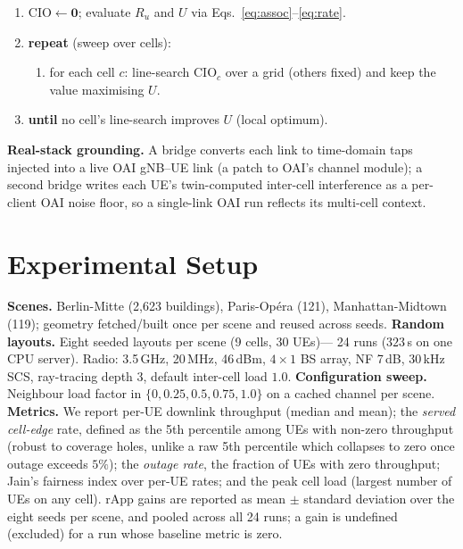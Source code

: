 \documentclass[conference]{IEEEtran}
\begin{document}
\begin{algorithm}[t]
\caption{Proportional-fair traffic steering}
\label{alg:ts}
\footnotesize
\begin{enumerate}
\item $\mathrm{CIO}\leftarrow \mathbf{0}$; evaluate $R_u$ and $U$ via
Eqs.~\eqref{eq:assoc}--\eqref{eq:rate}.
\item \textbf{repeat} (sweep over cells):
  \begin{enumerate}
  \item for each cell $c$: line-search $\mathrm{CIO}_c$ over a grid (others fixed)
  and keep the value maximising $U$.
  \end{enumerate}
\item \textbf{until} no cell's line-search improves $U$ (local optimum).
\end{enumerate}
\end{algorithm}

\textbf{Real-stack grounding.} A bridge converts each link to time-domain taps
injected into a live OAI gNB--UE link (a patch to OAI's channel module); a second
bridge writes each UE's twin-computed inter-cell interference as a per-client OAI
noise floor, so a single-link OAI run reflects its multi-cell context.

\section{Experimental Setup}
\textbf{Scenes.} Berlin-Mitte (2{,}623 buildings), Paris-Op\'era (121),
Manhattan-Midtown (119); geometry fetched/built once per scene and reused across
seeds. \textbf{Random layouts.} Eight seeded layouts per scene (9 cells, 30 UEs)---
24 runs ($323$\,s on one CPU server). Radio: 3.5\,GHz, 20\,MHz,
46\,dBm, $4\times1$ BS array, NF 7\,dB, 30\,kHz SCS, ray-tracing
depth 3, default inter-cell load $1.0$. \textbf{Configuration sweep.} Neighbour
load factor in $\{0,0.25,0.5,0.75,1.0\}$ on a cached channel per scene.
\textbf{Metrics.} We report per-UE downlink throughput (median and mean); the
\emph{served cell-edge} rate, defined as the 5th percentile among UEs with non-zero
throughput (robust to coverage holes, unlike a raw 5th percentile which collapses
to zero once outage exceeds $5\%$); the \emph{outage rate}, the fraction of UEs with
zero throughput; Jain's fairness index over per-UE rates; and the peak cell load
(largest number of UEs on any cell). rApp gains are reported as mean $\pm$ standard
deviation over the eight seeds per scene, and pooled across all 24 runs; a gain is
undefined (excluded) for a run whose baseline metric is zero.
\end{document}
